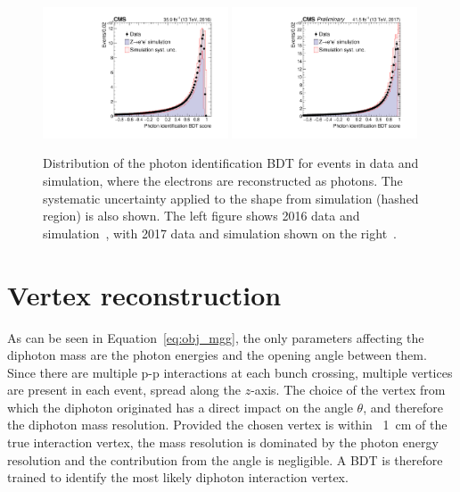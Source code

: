 \begin{figure}[h!]
  \centering
  \includegraphics[width=0.49\textwidth]{Figures/Objects/ZeeIDMVA2016}
  \includegraphics[width=0.49\textwidth]{Figures/Objects/ZeeIDMVA2017}
  \caption[Photon identification BDT score validation in \Zee events.]
  {
    Distribution of the photon identification BDT
    for \Zee events in data and simulation, where the electrons are reconstructed as photons. 
    The systematic uncertainty applied to the shape from simulation (hashed region) is also shown.
    The left figure shows 2016 data and simulation~\cite{HIG-16-040}, 
    with 2017 data and simulation shown on the right~\cite{HIG-18-029}.
  }
  \label{fig:obj_ZeeIDMVA}
\end{figure}

\section{Vertex reconstruction}

As can be seen in Equation~\ref{eq:obj_mgg}, 
the only parameters affecting the diphoton mass are the photon energies and the opening angle between them.
Since there are multiple p-p interactions at each bunch crossing, multiple vertices are present in each event, spread along the $z$-axis.
The choice of the vertex from which the diphoton originated has a direct impact on the angle $\theta$, 
and therefore the diphoton mass resolution.
Provided the chosen vertex is within ~\SI{1}{cm} of the true interaction vertex,
the mass resolution is dominated by the photon energy resolution and the contribution from the angle is negligible.
A BDT is therefore trained to identify the most likely diphoton interaction vertex.

